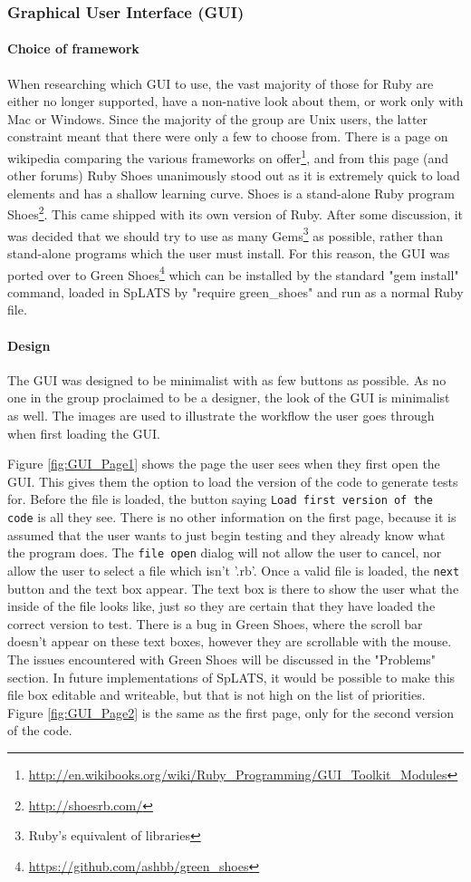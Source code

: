   \subsubsection{Graphical User Interface (GUI)}
  \paragraph{Choice of framework}
  When researching which GUI to use, the vast majority of those for Ruby are either no longer supported, have a non-native look about them, or work only with Mac or Windows. Since the majority of the group are Unix users, the latter constraint meant that there were only a few to choose from. There is a page on wikipedia comparing the various frameworks on offer\footnote{\url{http://en.wikibooks.org/wiki/Ruby_Programming/GUI_Toolkit_Modules}}, and from this page (and other forums) Ruby Shoes unanimously stood out as it is extremely quick to load elements and has a shallow learning curve.
  Shoes is a stand-alone Ruby program Shoes\footnote{\url{http://shoesrb.com/}}. This came shipped with its own version of Ruby. After some discussion, it was decided that we should try to use as many Gems\footnote{Ruby's equivalent of libraries} as possible, rather than stand-alone programs which the user must install. For this reason, the GUI was ported over to Green Shoes\footnote{\url{https://github.com/ashbb/green_shoes}} which can be installed by the standard "gem install" command, loaded in SpLATS by "require green\_shoes" and run as a normal Ruby file.
  
  \paragraph{Design}
  The GUI was designed to be minimalist with as few buttons as possible. As no one in the group proclaimed to be a designer, the look of the GUI is minimalist as well. The images are used to illustrate the workflow the user goes through when first loading the GUI.
  
  Figure \ref{fig:GUI_Page1} shows the page the user sees when they first open the GUI. This gives them the option to load the version of the code to generate tests for. Before the file is loaded, the button saying \verb+Load first version of the code+ is all they see. There is no other information on the first page, because it is assumed that the user wants to just begin testing and they already know what the program does. The \verb+file open+ dialog will not allow the user to cancel, nor allow the user to select a file which isn't '.rb'. Once a valid file is loaded, the \verb+next+ button and the text box appear. The text box is there to show the user what the inside of the file looks like, just so they are certain that they have loaded the correct version to test. There is a bug in Green Shoes, where the scroll bar doesn't appear on these text boxes, however they are scrollable with the mouse. The issues encountered with Green Shoes will be discussed in the "Problems" section. In future implementations of SpLATS, it would be possible to make this file box editable and writeable, but that is not high on the list of priorities.
Figure \ref{fig:GUI_Page2} is the same as the first page, only for the second version of the code.
  
